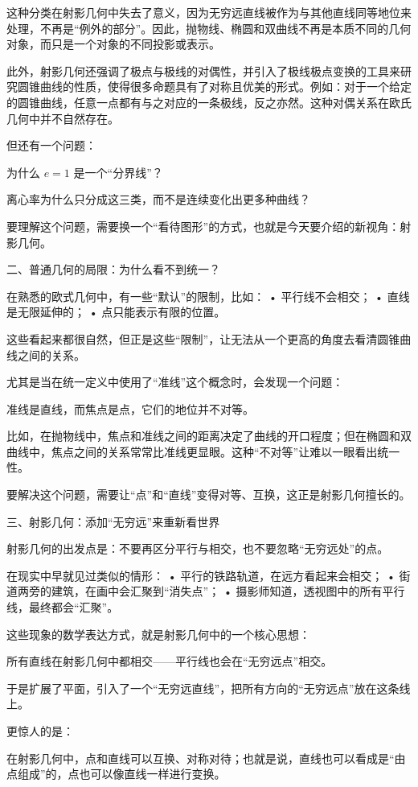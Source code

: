 这种分类在射影几何中失去了意义，因为无穷远直线被作为与其他直线同等地位来处理，不再是“例外的部分”。因此，抛物线、椭圆和双曲线不再是本质不同的几何对象，而只是一个对象的不同投影或表示。

此外，射影几何还强调了极点与极线的对偶性，并引入了极线极点变换的工具来研究圆锥曲线的性质，使得很多命题具有了对称且优美的形式。例如：对于一个给定的圆锥曲线，任意一点都有与之对应的一条极线，反之亦然。这种对偶关系在欧氏几何中并不自然存在。



但还有一个问题：

为什么 $e=1$ 是一个“分界线”？

离心率为什么只分成这三类，而不是连续变化出更多种曲线？

要理解这个问题，需要换一个“看待图形”的方式，也就是今天要介绍的新视角：射影几何。


二、普通几何的局限：为什么看不到统一？

在熟悉的欧式几何中，有一些“默认”的限制，比如：
	•	平行线不会相交；
	•	直线是无限延伸的；
	•	点只能表示有限的位置。

这些看起来都很自然，但正是这些“限制”，让无法从一个更高的角度去看清圆锥曲线之间的关系。

尤其是当在统一定义中使用了“准线”这个概念时，会发现一个问题：

准线是直线，而焦点是点，它们的地位并不对等。

比如，在抛物线中，焦点和准线之间的距离决定了曲线的开口程度；但在椭圆和双曲线中，焦点之间的关系常常比准线更显眼。这种“不对等”让难以一眼看出统一性。

要解决这个问题，需要让“点”和“直线”变得对等、互换，这正是射影几何擅长的。

三、射影几何：添加“无穷远”来重新看世界

射影几何的出发点是：不要再区分平行与相交，也不要忽略“无穷远处”的点。

在现实中早就见过类似的情形：
	•	平行的铁路轨道，在远方看起来会相交；
	•	街道两旁的建筑，在画中会汇聚到“消失点”；
	•	摄影师知道，透视图中的所有平行线，最终都会“汇聚”。

这些现象的数学表达方式，就是射影几何中的一个核心思想：

所有直线在射影几何中都相交——平行线也会在“无穷远点”相交。

于是扩展了平面，引入了一个“无穷远直线”，把所有方向的“无穷远点”放在这条线上。

更惊人的是：

在射影几何中，点和直线可以互换、对称对待；也就是说，直线也可以看成是“由点组成”的，点也可以像直线一样进行变换。

